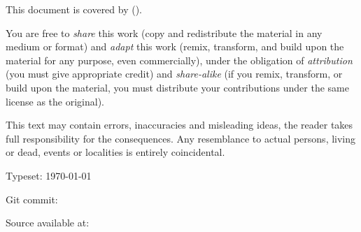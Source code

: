 
{\small
\setlength{\parindent}{0em}
\setlength{\parskip}{1em}

\vspace*{\fill}

\doclicenseIcon%
This document is covered by
\doclicenseLongNameRef{} (\doclicenseNameRef).

You are free to
\emph{share} this work (copy and redistribute the material in any medium or format)
and
\emph{adapt} this work (remix, transform, and build upon the material for any purpose, even commercially),
under the obligation of
\emph{attribution} (you must give appropriate credit)
and
\emph{share-alike} (if you remix, transform, or build upon the material, you must distribute your contributions under the same license as the original).

This text may contain errors, inaccuracies and misleading ideas, the reader takes full responsibility for the consequences.
Any resemblance to actual persons, living or dead, events or localities is entirely coincidental.

Typeset: \today

Git commit: \commiturl%

Source available at: \thesourcelink%
}
